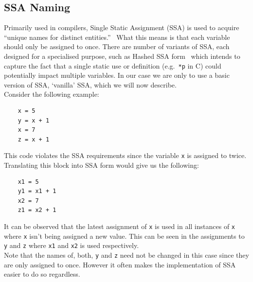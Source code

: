 \documentclass[12pt, titlepage]{article}
\begin{document}
\subsection{SSA Naming}
Primarily used in compilers, Single Static Assignment (SSA) is used to acquire ``unique names for distinct entities.''~\cite{ssaBook} What this means is that each variable should only be assigned to once. There are number of variants of SSA, each designed for a specialised purpose, such as Hashed SSA form~\cite{ssaBook} which intends to capture the fact that a single static use or definition (e.g.\ \texttt{*p} in C) could potentially impact multiple variables. In our case we are only to use a basic version of SSA, `vanilla' SSA, which we will now describe. \\
Consider the following example:
\begin{lstlisting}
    x = 5
    y = x + 1
    x = 7
    z = x + 1
\end{lstlisting}
This code violates the SSA requirements since the variable \texttt{x} is assigned to twice. Translating this block into SSA form would give us the following:
\begin{lstlisting}
    x1 = 5
    y1 = x1 + 1
    x2 = 7
    z1 = x2 + 1
\end{lstlisting}
It can be observed that the latest assignment of \texttt{x}  is used in all instances of \texttt{x} where \texttt{x} isn't being assigned a new value. This can be seen in the assignments to \texttt{y} and \texttt{z} where \texttt{x1} and \texttt{x2} is used respectively. \\
Note that the names of, both, \texttt{y} and \texttt{z} need not be changed in this case since they are only assigned to once. However it often makes the implementation of SSA easier to do so regardless.
\end{document}
